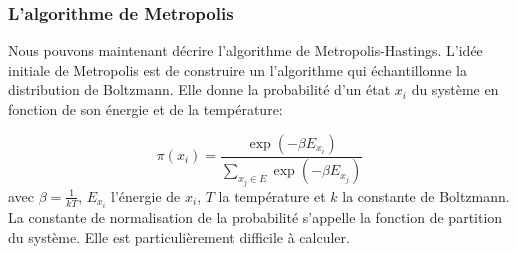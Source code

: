 \subsubsection{L'algorithme de Metropolis}

Nous pouvons maintenant décrire l'algorithme de Metropolis-Hastings. L'idée initiale de Metropolis est de construire un l'algorithme qui échantillonne la distribution de Boltzmann. Elle donne la probabilité d'un état $x_i$ du système en fonction de son énergie et de la température:

\begin{equation}
  \label{eq:Boltzmann}
\pi(x_i) = \frac{\exp(-\beta E_{x_i})}{\sum_{x_j \in E}\exp(-\beta E_{x_j})} 
\end{equation}
avec $\beta = \frac{1}{kT}$, $E_{x_i}$  l'énergie de $x_i$, $T$ la température et $k$ la constante de Boltzmann. La constante de normalisation de la probabilité s'appelle la fonction de partition du système. Elle est particulièrement difficile à calculer.

